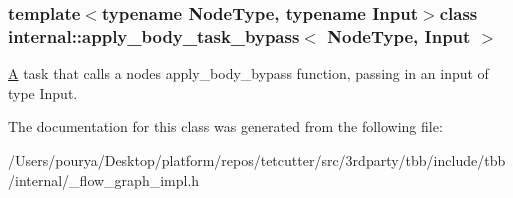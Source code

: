 \subsubsection*{template$<$typename Node\+Type, typename Input$>$class internal\+::apply\+\_\+body\+\_\+task\+\_\+bypass$<$ Node\+Type, Input $>$}

\hyperlink{structA}{A} task that calls a node\textquotesingle{}s apply\+\_\+body\+\_\+bypass function, passing in an input of type Input. 

The documentation for this class was generated from the following file\+:\begin{DoxyCompactItemize}
\item 
/\+Users/pourya/\+Desktop/platform/repos/tetcutter/src/3rdparty/tbb/include/tbb/internal/\+\_\+flow\+\_\+graph\+\_\+impl.\+h\end{DoxyCompactItemize}
